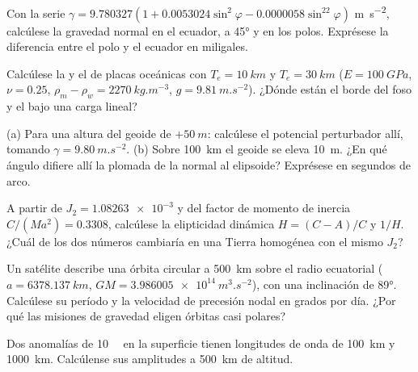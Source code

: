\begin{exercise}[$\star$]\label{exo:b3:gravity-geodesy:3}
Con la serie $\gamma = 9.780327(1 + 0.0053024\sin^2\varphi -
0.0000058\sin^22\varphi)$ \unit{m.s^{-2}}, calcúlese la gravedad normal en el
ecuador, a \ang{45} y en los polos. Exprésese la diferencia entre el polo
y el ecuador en miligales.
\end{exercise}

\begin{exercise}[$\star$]\label{exo:b3:gravity-geodesy:4}
Calcúlese la  y el  de placas oceánicas
con $T_e = \qty{10}{km}$ y $T_e = \qty{30}{km}$ ($E = \qty{100}{GPa}$,
$\nu = 0.25$, $\rho_m - \rho_w = \qty{2270}{kg.m^{-3}}$, $g =
\qty{9.81}{m.s^{-2}}$).
¿Dónde están el borde del foso y el  bajo una carga lineal?
\end{exercise}

\begin{exercise}[$\star\star$]\label{exo:b3:gravity-geodesy:5}
(a) Para una altura del geoide de $+\qty{50}{m}$: calcúlese el potencial perturbador allí,
tomando $\gamma = \qty{9.80}{m.s^{-2}}$. (b) Sobre \qty{100}{km} el geoide se eleva
\qty{10}{m}. ¿En qué ángulo difiere allí la plomada de la normal al
elipsoide? Exprésese en segundos de arco.
\end{exercise}

\begin{exercise}[$\star\star$]\label{exo:b3:gravity-geodesy:6}
A partir de $J_2 = \num{1.08263e-3}$ y del factor de momento de inercia
$C/(Ma^2) = \num{0.3308}$, calcúlese la elipticidad dinámica $H = (C - A)/C$ y
$1/H$. ¿Cuál de los dos números cambiaría en una Tierra homogénea con el mismo $J_2$?
\end{exercise}

\begin{exercise}[$\star\star$]\label{exo:b3:gravity-geodesy:7}
Un satélite describe una órbita circular a \qty{500}{km} sobre el radio ecuatorial
($a = \qty{6378.137}{km}$, $GM = \qty{3.986005e14}{m^3.s^{-2}}$), con una inclinación de
\ang{89}. Calcúlese su período y la velocidad de precesión nodal en grados por día.
¿Por qué las misiones de gravedad eligen órbitas casi polares?
\end{exercise}

\begin{exercise}[$\star\star$]\label{exo:b3:gravity-geodesy:8}
Dos anomalías de \qty{10}{\milli\gal} en la superficie tienen longitudes de onda de
\qty{100}{km} y \qty{1000}{km}. Calcúlense sus amplitudes a \qty{500}{km}
de altitud.
\end{exercise}


